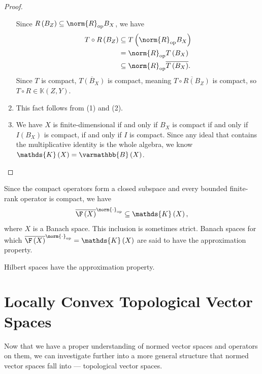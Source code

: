 \documentclass[10pt]{mypackage}
\renewcommand*{\mathbb}[1]{\varmathbb{#1}}
\newcommand{\B}{\mathbb{B}}
\begin{document}
\begin{proof}
\begin{enumerate}[(1)]
      Since $R\left(B_{Z}\right)\subseteq \norm{R}_{\text{op}}B_X$, we have
      \begin{align*}
        T\circ R\left(B_{Z}\right) &\subseteq T\left(\norm{R}_{\text{op}}B_X\right)\\
                                   &= \norm{R}_{\text{op}}T\left(B_{X}\right)\\
                                   &\subseteq \norm{R}_{\text{op}}\overline{T\left(B_{X}\right)}.
      \end{align*}
      Since $T$ is compact, $\overline{T\left(B_{X}\right)}$ is compact, meaning $\overline{T\circ R\left(B_{Z}\right)}$ is compact, so $T\circ R\in \mathds{K}\left(Z,Y\right)$.
    \item This fact follows from (1) and (2).
    \item We have $X$ is finite-dimensional if and only if $B_{X}$ is compact if and only if $I\left(B_{X}\right)$ is compact, if and only if $I$ is compact. Since any ideal that contains the multiplicative identity is the whole algebra, we know $\mathds{K}\left(X\right) = \B\left(X\right)$.
  \end{enumerate}
  
\end{proof}
\begin{remark}
  Since the compact operators form a closed subspace and every bounded finite-rank operator is compact, we have
  \begin{align*}
    \overline{\F\left(X\right)}^{\norm{\cdot}_{\text{op}}} \subseteq \mathds{K}\left(X\right),
  \end{align*}
  where $X$ is a Banach space. This inclusion is sometimes strict. Banach spaces for which $\overline{\F\left(X\right)}^{\norm{\cdot}_{\text{op}}} = \mathds{K}\left(X\right)$ are said to have the approximation property.\newline

  Hilbert spaces have the approximation property.
\end{remark}
\section{Locally Convex Topological Vector Spaces}%
Now that we have a proper understanding of normed vector spaces and operators on them, we can investigate further into a more general structure that normed vector spaces fall into --- topological vector spaces. 
\end{document}
